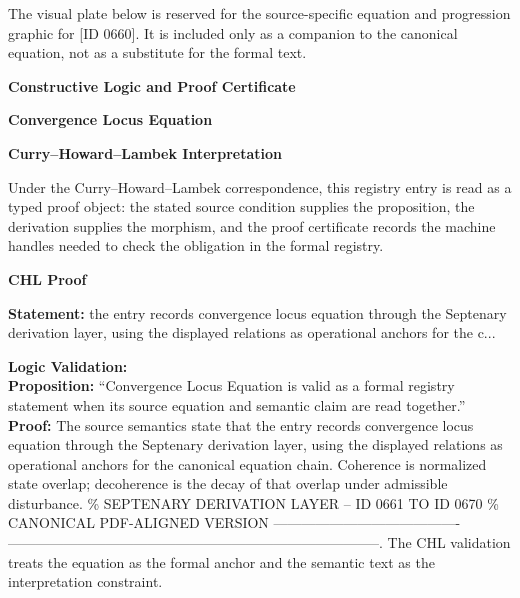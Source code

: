 \begingroup\footnotesize\sloppy
The visual plate below is reserved for the source-specific equation and progression graphic for [ID 0660]. It is included only as a companion to the canonical equation, not as a substitute for the formal text.
\par\endgroup
\ifTZPDarkEdition
{}
\fi

\clearpage
\begingroup\tzpsupportsetup
\noindent\textbf{\fontsize{10.8pt}{12.8pt}\selectfont [ID 0660] Constructive Logic and Proof Certificate}\par
\noindent\textbf{\fontsize{10pt}{12pt}\selectfont Convergence Locus Equation}\par
\vspace{0.45em}
\begingroup
\footnotesize
\setlength{\parskip}{0.22em}
\setlength{\parindent}{0pt}
\noindent\textbf{Curry--Howard--Lambek Interpretation}\par
Under the Curry--Howard--Lambek correspondence, this registry entry is read as a typed proof
object: the stated source condition supplies the proposition, the derivation supplies the
morphism, and the proof certificate records the machine handles needed to check the obligation
in the formal registry.

\vspace{0.45em}
\noindent\textbf{CHL Proof}\par
\textbf{Statement:} the entry records convergence locus equation through the Septenary derivation layer,
using the displayed relations as operational anchors for the c...

\textbf{Logic Validation:}\\
\textbf{Proposition:} ``Convergence Locus Equation is valid as a formal registry statement when its source
equation and semantic claim are read together.''\\
\textbf{Proof:} The source semantics state that the entry records convergence locus equation through the
Septenary derivation layer, using the displayed relations as operational anchors for the
canonical equation chain. Coherence is normalized state overlap; decoherence is the
decay of that overlap under admissible disturbance. \% SEPTENARY DERIVATION LAYER -- ID
0661 TO ID 0670 \% CANONICAL PDF-ALIGNED VERSION ----------------------------------------
--------------------------------------------------------------------------------. The
CHL validation treats the equation as the formal anchor and the semantic text as the
interpretation constraint.

